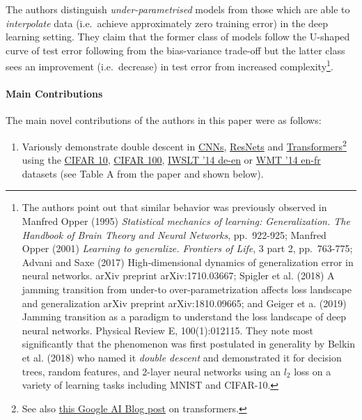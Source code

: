 \documentclass[]{article}
\providecommand{\tightlist}{%
  \setlength{\itemsep}{0pt}\setlength{\parskip}{0pt}}
\let\oldparagraph\paragraph
\renewcommand{\paragraph}[1]{\oldparagraph{#1}\mbox{}}
\begin{document}
The authors distinguish \emph{under-parametrised} models from those
which are able to \emph{interpolate} data (i.e.~achieve approximately
zero training error) in the deep learning setting. They claim that the
former class of models follow the U-shaped curve of test error following
from the bias-variance trade-off but the latter class sees an
improvement (i.e.~decrease) in test error from increased
complexity\footnote{The authors point out that similar behavior was
  previously observed in Manfred Opper (1995) \emph{Statistical
  mechanics of learning: Generalization. The Handbook of Brain Theory
  and Neural Networks}, pp.~922-925; Manfred Opper (2001) \emph{Learning
  to generalize. Frontiers of Life}, 3 part 2, pp.~763-775; Advani and
  Saxe (2017) High-dimensional dynamics of generalization error in
  neural networks. arXiv preprint arXiv:1710.03667; Spigler et al.
  (2018) A jamming transition from under-to over-parametrization affects
  loss landscape and generalization arXiv preprint arXiv:1810.09665; and
  Geiger et a. (2019) Jamming transition as a paradigm to understand the
  loss landscape of deep neural networks. Physical Review E,
  100(1):012115. They note most significantly that the phenomenon was
  first postulated in generality by Belkin et al. (2018) who named it
  \emph{double descent} and demonstrated it for decision trees, random
  features, and 2-layer neural networks using an \(l_2\) loss on a
  variety of learning tasks including MNIST and CIFAR-10.}.

\hypertarget{main-contributions}{%
\paragraph{Main Contributions}\label{main-contributions}}

The main novel contributions of the authors in this paper were as
follows:

\begin{enumerate}
\def\labelenumi{\arabic{enumi}.}
\tightlist
\item
  Variously demonstrate double descent in
  \href{https://en.wikipedia.org/wiki/Convolutional_neural_network}{CNNs},
  \href{https://en.wikipedia.org/wiki/Residual_neural_network}{ResNets}
  and
  \href{https://en.wikipedia.org/wiki/Transformer_(machine_learning_model)}{Transformers}\footnote{See
    also
    \href{https://ai.googleblog.com/2017/08/transformer-novel-neural-network.html}{this
    Google AI Blog post} on transformers.} using the
  \href{https://en.wikipedia.org/wiki/CIFAR-10}{CIFAR 10},
  \href{https://www.cs.toronto.edu/~kriz/cifar.html}{CIFAR 100},
  \href{http://www.statmt.org/wmt14/translation-task.html}{IWSLT '14
  de-en} or
  \href{https://www.tensorflow.org/datasets/catalog/wmt14_translate}{WMT
  '14 en-fr} datasets (see Table A from the paper and shown below).
\end{enumerate}
\end{document}
